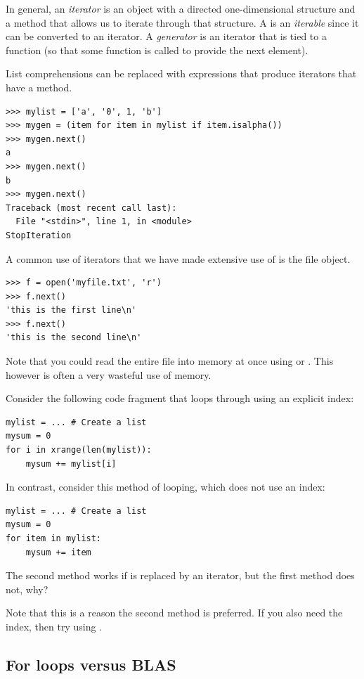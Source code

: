 In general, an \emph{iterator} is an object with a directed one-dimensional structure and a  method that allows us to iterate through that structure.  A  is an \emph{iterable} since it can be converted to an iterator.  A \emph{generator} is an iterator that is tied to a function (so that some function is called to provide the next element).

List comprehensions can be replaced with expressions that produce iterators that have a  method.
\begin{verbatim}
>>> mylist = ['a', '0', 1, 'b']
>>> mygen = (item for item in mylist if item.isalpha())
>>> mygen.next()
a
>>> mygen.next()
b
>>> mygen.next()
Traceback (most recent call last):
  File "<stdin>", line 1, in <module>
StopIteration
\end{verbatim}

A common use of iterators that we have made extensive use of is the file object.
\begin{verbatim}
>>> f = open('myfile.txt', 'r')
>>> f.next()
'this is the first line\n'
>>> f.next()
'this is the second line\n'
\end{verbatim}
Note that you could read the entire file into memory at once using  or .  This however is often a very wasteful use of memory.

\begin{exercise}
  Consider the following code fragment that loops through using an explicit index:
  \begin{verbatim}
mylist = ... # Create a list
mysum = 0
for i in xrange(len(mylist)):
    mysum += mylist[i]
  \end{verbatim}
In contrast, consider this method of looping, which does not use an index:
  \begin{verbatim}
mylist = ... # Create a list
mysum = 0
for item in mylist:
    mysum += item
  \end{verbatim}
  The second method works if  is replaced by an iterator, but the first method does not, why?  

  Note that this is a reason the second method is preferred.  If you also need the index, then try using .
\end{exercise}

\subsection{For loops versus BLAS}
\label{performance:subsection:forblas}

